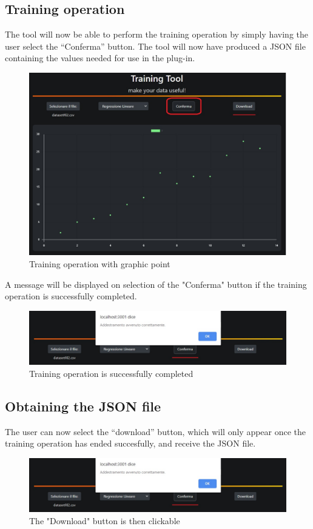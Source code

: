 \subsection{Training operation}
The tool will now be able to perform the training operation by simply  having the user select the “Conferma” button. The tool will now have produced a JSON file containing the values needed for use in the plug-in.
\begin{figure}[H]
\centering
\includegraphics[scale=0.65]{img/tool/confirm.jpg}
\caption{Training operation with graphic point}
\end{figure}

A message will be displayed on selection of the "Conferma" button if the training operation is successfully completed.
\newline
\begin{figure}[H]
\centering
\includegraphics[scale=0.65]{img/tool/ok_msg.jpg}
\caption{Training operation is successfully completed}
\end{figure}  

\subsection{Obtaining the JSON file}
The user can now select the “download” button, which will only appear once the training operation has ended succesfully, and receive the JSON file.
\begin{figure}[H]
\centering
\includegraphics[scale=0.65]{img/tool/ok_msg.jpg}
\caption{The "Download" button is then clickable}
\end{figure} 

